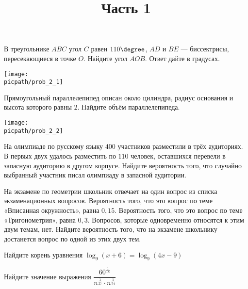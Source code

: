 %
%

\begin{training}[1]
	\title{Часть 1}
	\egepreambone
	\begin{listofex}
		\item
		\begin{minipage}[t]{\bodywidth}
			В треугольнике \( ABC \) угол \( C \) равен \( 110\degree \), \( AD \) и \( BE \) --- биссектрисы, пересекающиеся в точке \( O \). Найдите угол \( AOB \). Ответ дайте в градусах.
			\foranswer
		\end{minipage}
		\gapwidth
		\begin{minipage}[t]{\picwidth}
			\texttt{[image: \\picpath/prob\_2\_1]}
		\end{minipage}
		\item
		\begin{minipage}[t]{\bodywidth}
			Прямоугольный параллелепипед описан около цилиндра, радиус основания и высота которого равны \( 2 \). Найдите объём параллелепипеда.
			\foranswer
		\end{minipage}
		\gapwidth
		\begin{minipage}[t]{\picwidth}
			\texttt{[image: \\picpath/prob\_2\_2]}
		\end{minipage}
		\item На олимпиаде по русскому языку \( 400 \) участников разместили в трёх аудиториях. В первых двух удалось разместить по \( 110 \) человек, оставшихся перевели в запасную аудиторию в другом корпусе. Найдите вероятность того, что случайно выбранный участник писал олимпиаду в запасной аудитории.
		\foranswer
		\item На экзамене по геометрии школьник отвечает на один вопрос из списка экзаменационных вопросов. Вероятность того, что это вопрос по теме «Вписанная окружность», равна \( 0,15 \). Вероятность того, что это вопрос по теме «Тригонометрия», равна \( 0,3 \). Вопросов, которые одновременно относятся к этим двум темам, нет. Найдите вероятность того, что на экзамене школьнику достанется вопрос по одной из этих двух тем.
		\foranswer
	\end{listofex}
	\newpage
	\phantom{Часть 1}
	\begin{listofex}[resume]
		\item Найдите корень уравнения \( \log_9(x+6)=\log_9(4x-9) \)
		\foranswer
		\item Найдите значение выражения \( \dfrac{60^{\tfrac{1}{18}}}{n^{\tfrac{1}{27}}\cdot n^{\tfrac{1}{54}}} \)

\end{listofex}
\end{training}

